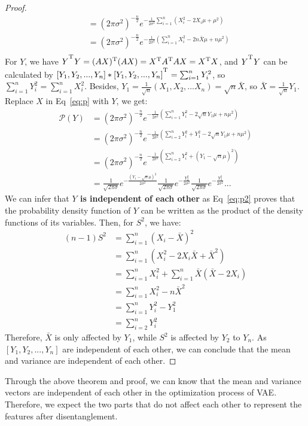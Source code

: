 \documentclass[letterpaper]{article} %
\begin{document}
\begin{proof}
\begin{equation}
\begin{array}{cl}
			&=(2\pi\sigma^2)^{-\frac{n}{2}}e^{-\frac{1}{2\sigma^2}\sum_{i=1}^{n}(X_i^2-2X_i\mu+\mu^2)} \\
			&=(2\pi\sigma^2)^{-\frac{n}{2}}e^{-\frac{1}{2\sigma^2}(\sum_{i=1}^{n}X_i^2-2n\bar{X}\mu+n\mu^2)} \\
		\end{array} \label{eq:p}
	\end{equation}
	For $Y$, we have $Y^\textsuperscript{T}Y=(AX)\textsuperscript{T}(AX)=X\textsuperscript{T}A\textsuperscript{T}AX=X\textsuperscript{T}X$, and $Y^\textsuperscript{T}Y$ can be calculated by $[Y_1, Y_2, ..., Y_n]*[Y_1, Y_2, ..., Y_n]^\textsuperscript{T} = \sum_{i=1}^{n}Y_i^2$, so $\sum_{i=1}^{n}Y_i^2=\sum_{i=1}^{n}X_i^2$. Besides, $Y_1=\frac{1}{\sqrt{n}}(X_1, X_2,...X_n)=\sqrt{n}\bar{X}$, so $\bar{X}=\frac{1}{\sqrt{n}}Y_1$. Replace $X$ in Eq~\ref{eq:p} with $Y$, we get:
	\begin{equation}
		\begin{array}{cl}
			\mathcal{P}(Y)&=(2\pi\sigma^2)^{-\frac{n}{2}}e^{-\frac{1}{2\sigma^2}(\sum_{i=1}^{n}Y_i^2-2\sqrt{n}Y_1\mu+n\mu^2)}\\
			&=(2\pi\sigma^2)^{-\frac{n}{2}}e^{-\frac{1}{2\sigma^2}(\sum_{i=2}^{n}Y_i^2+Y_1^2-2\sqrt{n}Y_1\mu+n\mu^2)} \\
			&=(2\pi\sigma^2)^{-\frac{n}{2}}e^{-\frac{1}{2\sigma^2}(\sum_{i=2}^{n}Y_i^2+(Y_1-\sqrt{n}\mu)^2)} \\
			&=\frac{1}{\sqrt{2\pi \sigma}}e^{-\frac{(Y_1-\sqrt{n}\mu)^2}{2\sigma^2}} \frac{1}{\sqrt{2\pi \sigma}}e^{-\frac{Y_2^2}{2\sigma^2}} \frac{1}{\sqrt{2\pi \sigma}}e^{-\frac{Y_3^2}{2\sigma^2}}...
		\end{array} \label{eq:p2}
	\end{equation}
	We can infer that \textbf{$Y$ is independent of each other} as Eq~\ref{eq:p2} proves that the probability density function of $Y$ can be written as the product of the density functions of its variables. Then, for $S^2$, we have:
	\begin{equation}
		\begin{array}{rl}
			(n-1)S^2&=\sum_{i=1}^{n}(X_i-\bar{X})^2 \\
			&=\sum_{i=1}^{n}(X_i^2-2X_i\bar{X}+\bar{X}^2) \\
			&=\sum_{i=1}^{n}X_i^2+\sum_{i=1}^{n}\bar{X}(\bar{X}-2X_i) \\
			&=\sum_{i=1}^{n}X_i^2-n\bar{X}^2 \\
			&=\sum_{i=1}^{n}Y_i^2-Y_1^2 \\
			&=\sum_{i=2}^{n}Y_i^2
		\end{array} \label{eq:p3}
	\end{equation}
	Therefore, $\bar{X}$ is only affected by $Y_1$, while $S^2$ is affected by $Y_2$ to $Y_n$. As $[Y_1, Y_2, ..., Y_n]$ are independent of each other, we can conclude that the mean and variance are independent of each other.
\end{proof}
Through the above theorem and proof, we can know that the mean and variance vectors are independent of each other in the optimization process of VAE. Therefore, we expect the two parts that do not affect each other to represent the features after disentanglement.
\end{document}
